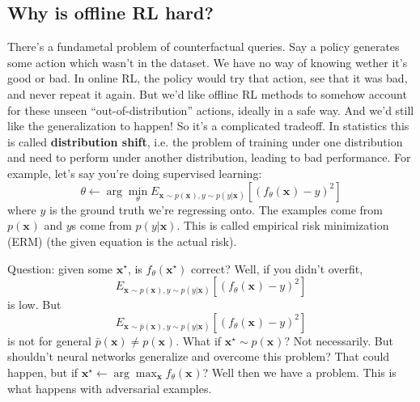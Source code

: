 \documentclass{report}
\newcommand{\argmin}{\arg\!\min}
\newcommand{\argmax}{\arg\!\max}
\begin{document}
\subsection{Why is offline RL hard?}
There's a fundametal problem of counterfactual queries.
Say a policy generates some action which wasn't in the dataset.
We have no way of knowing wether it's good or bad. In online RL,
the policy would try that action, see that it was bad, and never repeat it again.
But we'd like offline RL methods to somehow account for these unseen
``out-of-distribution'' actions, ideally in a safe way.
And we'd still like the generalization to happen!
So it's a complicated tradeoff.
In statistics this is called \textbf{distribution shift},
i.e. the problem of training under one distribution and need to perform under another distribution,
leading to bad performance.
For example, let's say you're doing supervised learning:
\begin{equation}
		\theta \leftarrow \argmin_\theta E_{\bm{x}_{} \sim p(\bm{x}_{}), y \sim p(y|\bm{x}_{})} 
		\left[ (f_\theta(\bm{x}_{}) - y)^2 \right] 
\end{equation}
where $y  $ is the ground truth we're regressing onto.
The examples come from $ p(\bm{x}_{}) $ and $y$s come from $ p(y|\bm{x}) $.
This is called empirical risk minimization (ERM)
 (the given equation is the actual risk).

 Question: given some $ \bm{x}_{}^\star $, is $ f_\theta(\bm{x}_{}^\star )$ correct?
 Well, if you didn't overfit,
 \begin{equation}
E_{\bm{x}_{} \sim p(\bm{x}_{}), y \sim p(y|\bm{x}_{})} 
		\left[ (f_\theta(\bm{x}_{}) - y)^2 \right]
\end{equation} 
is low.
But 
\begin{equation}
   	 E_{\bm{x}_{} \sim \bar{p}(\bm{x}_{}), y \sim p(y|\bm{x}_{})} 
   	\left[ (f_\theta(\bm{x}_{}) - y)^2 \right]
\end{equation} 
is not for general $ \bar{p}(\bm{x}) \neq p(\bm{x}_{}) $.
What if $ \bm{x}_{}^\star \sim p(\bm{x}_{}) $?
Not necessarily.
But shouldn't neural networks generalize and overcome this problem?
That could happen, but if
$ \bm{x}_{}^\star \leftarrow \argmax_{\bm{x}} f_\theta(\bm{x}_{}) $?
Well then we have a problem.
This is what happens with adversarial examples.
\end{document}
